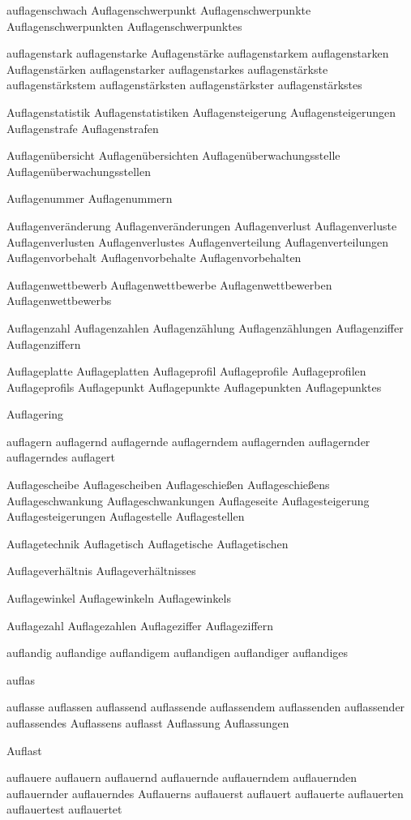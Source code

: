 auflagenschwach
Auflagenschwerpunkt
Auflagenschwerpunkte
Auflagenschwerpunkten
Auflagenschwerpunktes

auflagenstark
auflagenstarke
Auflagenstärke
auflagenstarkem
auflagenstarken
Auflagenstärken
auflagenstarker
auflagenstarkes
auflagenstärkste
auflagenstärkstem
auflagenstärksten
auflagenstärkster
auflagenstärkstes

Auflagenstatistik
Auflagenstatistiken
Auflagensteigerung
Auflagensteigerungen
Auflagenstrafe
Auflagenstrafen

Auflagenübersicht
Auflagenübersichten
Auflagenüberwachungsstelle
Auflagenüberwachungsstellen

Auflagenummer
Auflagenummern

Auflagenveränderung
Auflagenveränderungen
Auflagenverlust
Auflagenverluste
Auflagenverlusten
Auflagenverlustes
Auflagenverteilung
Auflagenverteilungen
Auflagenvorbehalt
Auflagenvorbehalte
Auflagenvorbehalten

Auflagenwettbewerb
Auflagenwettbewerbe
Auflagenwettbewerben
Auflagenwettbewerbs

Auflagenzahl
Auflagenzahlen
Auflagenzählung
Auflagenzählungen
Auflagenziffer
Auflagenziffern

Auflageplatte
Auflageplatten
Auflageprofil
Auflageprofile
Auflageprofilen
Auflageprofils
Auflagepunkt
Auflagepunkte
Auflagepunkten
Auflagepunktes

Auflagering

auflagern
auflagernd
auflagernde
auflagerndem
auflagernden
auflagernder
auflagerndes
auflagert

Auflagescheibe
Auflagescheiben
Auflageschießen
Auflageschießens
Auflageschwankung
Auflageschwankungen
Auflageseite
Auflagesteigerung
Auflagesteigerungen
Auflagestelle
Auflagestellen

Auflagetechnik
Auflagetisch
Auflagetische
Auflagetischen

Auflageverhältnis
Auflageverhältnisses

Auflagewinkel
Auflagewinkeln
Auflagewinkels

Auflagezahl
Auflagezahlen
Auflageziffer
Auflageziffern

auflandig
auflandige
auflandigem
auflandigen
auflandiger
auflandiges

auflas

auflasse
auflassen
auflassend
auflassende
auflassendem
auflassenden
auflassender
auflassendes
Auflassens
auflasst
Auflassung
Auflassungen

Auflast

auflauere
auflauern
auflauernd
auflauernde
auflauerndem
auflauernden
auflauernder
auflauerndes
Auflauerns
auflauerst
auflauert
auflauerte
auflauerten
auflauertest
auflauertet

